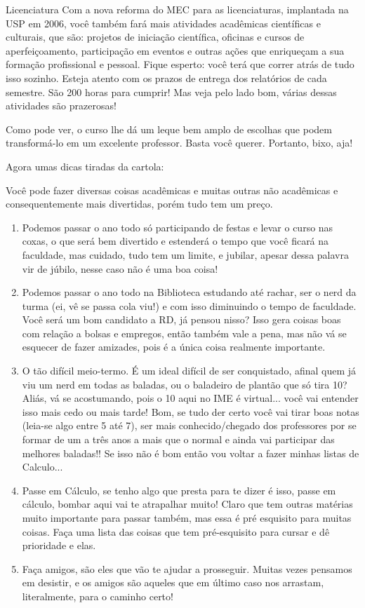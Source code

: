 \begin{subsecao}{Licenciatura}
Com a nova reforma do MEC para as licenciaturas, implantada na USP em 2006,
você também fará mais atividades acadêmicas científicas e culturais, que são:
projetos de iniciação científica, oficinas e cursos de aperfeiçoamento,
participação em eventos e outras ações que enriqueçam a sua formação
profissional e pessoal. Fique esperto: você terá que correr atrás de tudo isso
sozinho. Esteja atento com os prazos de entrega dos relatórios de cada
semestre. São 200 horas para cumprir! Mas veja pelo lado bom, várias dessas
atividades são prazerosas!

Como pode ver, o curso lhe dá um leque bem amplo de escolhas que podem
transformá-lo em um excelente professor. Basta você querer. Portanto, bixo, aja!

Agora umas dicas tiradas da cartola:

Você pode fazer diversas coisas acadêmicas e muitas outras não acadêmicas e
consequentemente mais divertidas, porém tudo tem um preço.
\begin{enumerate}
\item	Podemos passar o ano todo só participando de festas e levar o curso nas
coxas, o que será bem divertido e estenderá o tempo que você ficará na
faculdade, mas cuidado, tudo tem um limite, e jubilar, apesar dessa palavra vir
de júbilo, nesse caso não é uma boa coisa!
\item	Podemos passar o ano todo na Biblioteca estudando até rachar, ser o nerd
da turma (ei, vê se passa cola viu!) e com isso diminuindo o tempo de
faculdade. Você será um bom candidato a RD, já pensou nisso? Isso gera coisas
boas com relação a bolsas e empregos, então também vale a pena, mas não vá se
esquecer de fazer amizades, pois é a única coisa realmente importante.
\item	O tão difícil meio-termo. É um ideal difícil de ser conquistado, afinal
quem já viu um nerd em todas as baladas, ou o baladeiro de plantão que só
tira 10? Aliás, vá se acostumando, pois o 10 aqui no IME é virtual... você vai
entender isso mais cedo ou mais tarde! Bom, se tudo der certo você vai tirar
boas notas (leia-se algo entre 5 até 7), ser mais conhecido/chegado dos
professores por se formar de um a três anos a mais que o normal e ainda vai
participar das melhores baladas!! Se isso não é bom então vou voltar a fazer
minhas listas de Calculo...
\item	Passe em Cálculo, se tenho algo que presta para te dizer é isso, passe em
cálculo, bombar aqui vai te atrapalhar muito! Claro que tem outras matérias
muito importante para passar também, mas essa é pré esquisito para muitas
coisas. Faça uma lista das coisas que tem pré-esquisito para cursar e dê
prioridade e elas.
\item	Faça amigos, são eles que vão te ajudar a prosseguir. Muitas vezes
pensamos em desistir, e os amigos são aqueles que em último caso nos arrastam,
literalmente, para o caminho certo!

\end{enumerate}

\end{subsecao}
